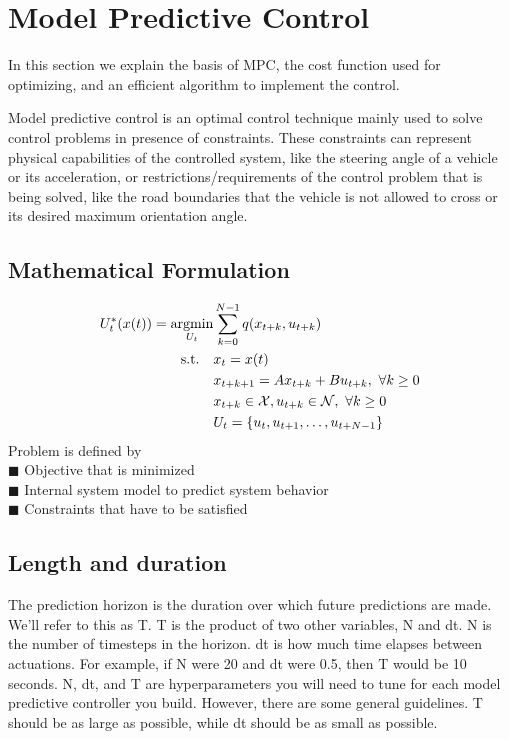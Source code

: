 \section{Model Predictive Control}
\label{sec:ModelPredictiveControl}
In this section we explain the basis of MPC, the cost function used for optimizing, and an efficient algorithm to implement the control.

Model predictive control is an optimal control technique mainly used to solve control problems in presence of constraints. These constraints can represent physical capabilities of the controlled system, like the steering angle of a vehicle or its acceleration, or restrictions/requirements of the control problem that is being solved, like the road boundaries that the vehicle is not allowed to cross or its desired maximum orientation angle.

\subsection{Mathematical Formulation}
\begin{subequations}\label{eq:MathematicalFormulation}
\begin{align}
U_t^*(x(t)) = \operatorname*{argmin}_{U_t}&\sum\limits_{k=0}^{N-1}q(x_{t+k},u_{t+k}) \\
  \text{s.t.} \quad &x_t = x(t) \\
  &x_{t+k+1}  = Ax_{t+k}+Bu_{t+k},~\forall k\geq 0 \\
  &x_{t+k} \in \mathcal{X},u_{t+k} \in \mathcal{N},~\forall k\geq 0 \\
  &U_t = \{u_t,u_{t+1},\ldots,u_{t+N-1}\}
\end{align}
\end{subequations}
Problem is defined by \\
\indent $\blacksquare$ Objective that is minimized \\
\indent $\blacksquare$ Internal system model to predict system behavior \\
\indent $\blacksquare$ Constraints that have to be satisfied \\
\subsection{Length and duration}

The prediction horizon is the duration over which future predictions are made. We’ll refer to this as T.
T is the product of two other variables, N and dt.
N is the number of timesteps in the horizon. dt is how much time elapses between actuations. For example, if N were 20 and dt were 0.5, then T would be 10 seconds.
N, dt, and T are hyperparameters you will need to tune for each model predictive controller you build. However, there are some general guidelines. T should be as large as possible, while dt should be as small as possible.

